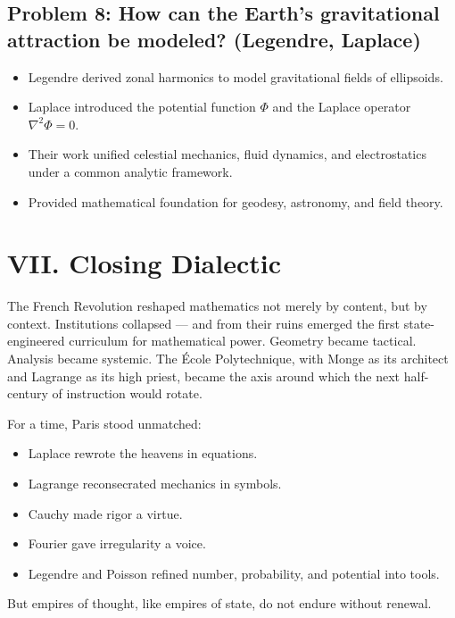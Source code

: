 \documentclass[9pt]{article}
\begin{document}
\subsection*{Problem 8: How can the Earth’s gravitational attraction be modeled? (Legendre, Laplace)}
\begin{itemize}
  \item Legendre derived zonal harmonics to model gravitational fields of ellipsoids.
  \item Laplace introduced the potential function \( \Phi \) and the Laplace operator \( \nabla^2 \Phi = 0 \).
  \item Their work unified celestial mechanics, fluid dynamics, and electrostatics under a common analytic framework.
  \item Provided mathematical foundation for geodesy, astronomy, and field theory.
\end{itemize}


\newpage

\section*{VII. Closing Dialectic}

The French Revolution reshaped mathematics not merely by content, but by context. Institutions collapsed — and from their ruins emerged the first state-engineered curriculum for mathematical power. Geometry became tactical. Analysis became systemic. The École Polytechnique, with Monge as its architect and Lagrange as its high priest, became the axis around which the next half-century of instruction would rotate.

For a time, Paris stood unmatched:  
\begin{itemize}
  \item Laplace rewrote the heavens in equations.  
  \item Lagrange reconsecrated mechanics in symbols.  
  \item Cauchy made rigor a virtue.  
  \item Fourier gave irregularity a voice.  
  \item Legendre and Poisson refined number, probability, and potential into tools.  
\end{itemize}

But empires of thought, like empires of state, do not endure without renewal.
\end{document}
